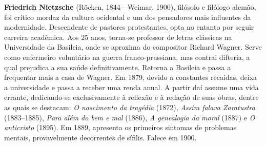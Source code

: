 \textbf{Friedrich Nietzsche} (Röcken, 1844---Weimar, 1900), filósofo 
e filólogo alemão, foi crítico mordaz da cultura ocidental 
e um dos pensadores mais influentes da modernidade. Descendente de pastores 
protestantes, opta no entanto por seguir carreira acadêmica. 
Aos 25 anos, torna-se professor de letras clássicas na Universidade 
da Basileia, onde se aproxima do compositor Richard Wagner. Serve 
como enfermeiro voluntário na guerra franco-prussiana, mas contrai 
difteria, a qual prejudica a sua saúde definitivamente. Retorna a 
Basileia e passa a frequentar mais a casa de Wagner. Em 
1879, devido a constantes recaídas, deixa a universidade e passa a 
receber uma renda anual. A partir daí assume uma vida errante, 
dedicando-se exclusivamente à reflexão e à redação de suas obras, 
dentre as quais se destacam: \textit{O nascimento da tragédia} (1872), 
\textit{Assim falava Zaratustra} (1883--1885), \textit{Para além do bem e mal} (1886), 
\textit{A genealogia da moral} (1887) e \textit{O anticristo} (1895). Em 1889, 
apresenta os primeiros sintomas de problemas mentais, provavelmente 
decorrentes de sífilis. Falece em 1900.



